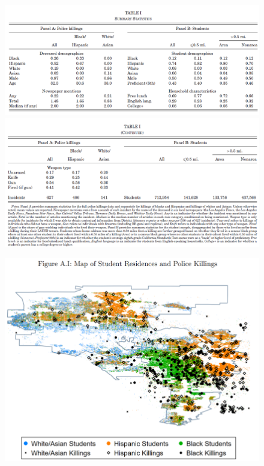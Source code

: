 \documentclass[dvipdfmx]{beamer}
\begin{document}
\begin{frame}{}
  \begin{figure}
    \centering
    \includegraphics[scale = .45]{fig_tab/os20220113/T1}
    \includegraphics[scale = .45]{fig_tab/os20220113/T1_1}
  \end{figure}
\end{frame}

\begin{frame}{}
  \begin{figure}
    \centering
    \includegraphics[scale = .55]{fig_tab/os20220113/FA1}
  \end{figure}
\end{frame}
\end{document}
